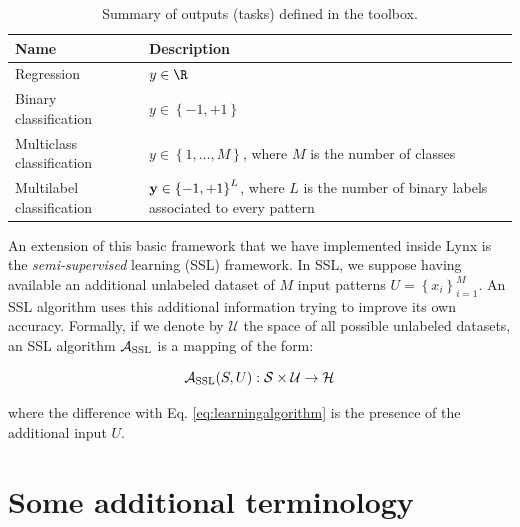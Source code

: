 \begin{center}
\begin{table}[t]
	{\centering\hfill{}
		\begin{tabular}{p{}p{}}
			\toprule
			Name & Description \\ 
			\midrule
			Regression & $y \in \R$  \\
			Binary classification & $y \in \left\{-1,+1\right\}$  \\
			Multiclass classification & $y \in \left\{1,\dots,M\right\}$, where $M$ is the number of classes  \\
			Multilabel classification & $\mathbf{y} \in \left\{-1,+1\right\}^L$, where $L$ is the number of binary labels associated to every pattern \\
			\bottomrule
		\end{tabular}}
		\hfill{}
		\caption{Summary of outputs (tasks) defined in the toolbox.}
		\label{tab:basictasks}
	\end{table}
\end{center}
\vspace{-5em}
An extension of this basic framework that we have implemented inside Lynx is the \textit{semi-supervised} learning (SSL) framework.\cite{chapelle2006semi} In SSL, we suppose having available an additional unlabeled dataset of $M$ input patterns $U = \left\{ x_i \right\}_{i=1}^M$. An SSL algorithm uses this additional information trying to improve its own accuracy. Formally, if we denote by $\mathcal{U}$ the space of all possible unlabeled datasets, an SSL algorithm $\mathcal{A}_{\mbox{\scriptsize SSL}}$ is a mapping of the form:

\begin{equation}
\mathcal{A}_{\mbox{\scriptsize SSL}}(S,U): \mathcal{S} \times \mathcal{U} \rightarrow \mathcal{H}
\label{eq:ssl}
\end{equation}

\noindent where the difference with Eq. \eqref{eq:learningalgorithm} is the presence of the additional input $U$.

\section{Some additional terminology}

